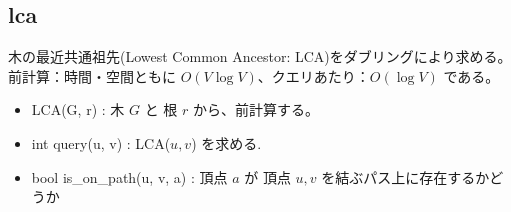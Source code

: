 \subsection{lca}

木の最近共通祖先(Lowest Common Ancestor: LCA)をダブリングにより求める。前計算：時間・空間ともに $O(V \log V)$、クエリあたり：$O(\log V)$ である。
\begin{itemize}
    \item LCA(G, r) : 木 $G$ と 根 $r$ から、前計算する。
    \item int query(u, v) : LCA($u,v$) を求める.
    \item bool is\_on\_path(u, v, a) : 頂点 $a$ が 頂点 $u, v$ を結ぶパス上に存在するかどうか
\end{itemize}

